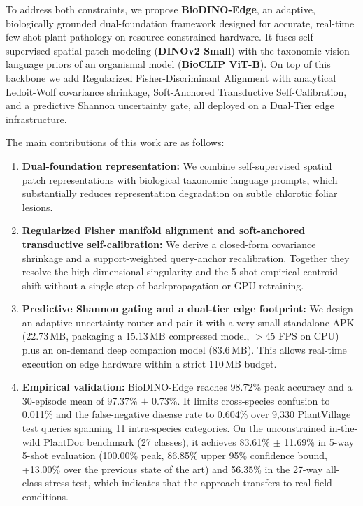 \documentclass[conference]{IEEEtran}
\begin{document}
To address both constraints, we propose \textbf{BioDINO-Edge}, an adaptive, biologically grounded dual-foundation framework designed for accurate, real-time few-shot plant pathology on resource-constrained hardware. It fuses self-supervised spatial patch modeling (\textbf{DINOv2 Small}) with the taxonomic vision-language priors of an organismal model (\textbf{BioCLIP ViT-B}). On top of this backbone we add Regularized Fisher-Discriminant Alignment with analytical Ledoit-Wolf covariance shrinkage, Soft-Anchored Transductive Self-Calibration, and a predictive Shannon uncertainty gate, all deployed on a Dual-Tier edge infrastructure.

The main contributions of this work are as follows:
\begin{enumerate}
    \item \textbf{Dual-foundation representation:} We combine self-supervised spatial patch representations with biological taxonomic language prompts, which substantially reduces representation degradation on subtle chlorotic foliar lesions.
    \item \textbf{Regularized Fisher manifold alignment and soft-anchored transductive self-calibration:} We derive a closed-form covariance shrinkage and a support-weighted query-anchor recalibration. Together they resolve the high-dimensional singularity and the 5-shot empirical centroid shift without a single step of backpropagation or GPU retraining.
    \item \textbf{Predictive Shannon gating and a dual-tier edge footprint:} We design an adaptive uncertainty router and pair it with a very small standalone APK (22.73\,MB, packaging a 15.13\,MB compressed model, $>$45 FPS on CPU) plus an on-demand deep companion model (83.6\,MB). This allows real-time execution on edge hardware within a strict 110\,MB budget.
    \item \textbf{Empirical validation:} BioDINO-Edge reaches 98.72\% peak accuracy and a 30-episode mean of 97.37\% $\pm$ 0.73\%. It limits cross-species confusion to 0.011\% and the false-negative disease rate to 0.604\% over 9,330 PlantVillage test queries spanning 11 intra-species categories. On the unconstrained in-the-wild PlantDoc benchmark (27 classes), it achieves 83.61\% $\pm$ 11.69\% in 5-way 5-shot evaluation (100.00\% peak, 86.85\% upper 95\% confidence bound, +13.00\% over the previous state of the art) and 56.35\% in the 27-way all-class stress test, which indicates that the approach transfers to real field conditions.
\end{enumerate}
\end{document}
